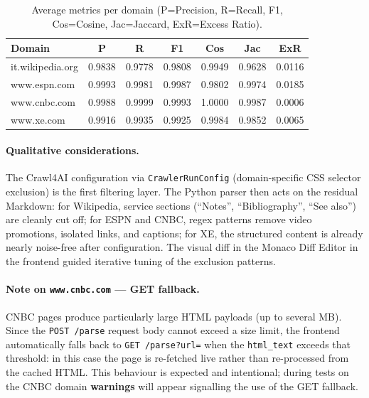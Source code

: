 \documentclass[11pt]{article}
\begin{document}
\begin{table}[h]
\centering
\small
\begin{tabular}{lcccccc}
\toprule
\textbf{Domain} & \textbf{P} & \textbf{R} & \textbf{F1} & \textbf{Cos} & \textbf{Jac} & \textbf{ExR}\\
\midrule
it.wikipedia.org  & 0.9838 & 0.9778 & 0.9808 & 0.9949 & 0.9628 & 0.0116 \\
www.espn.com      & 0.9993 & 0.9981 & 0.9987 & 0.9802 & 0.9974 & 0.0185 \\
www.cnbc.com      & 0.9988 & 0.9999 & 0.9993 & 1.0000 & 0.9987 & 0.0006 \\
www.xe.com        & 0.9916 & 0.9935 & 0.9925 & 0.9984 & 0.9852 & 0.0065 \\
\bottomrule
\end{tabular}
\caption{Average metrics per domain (P=Precision, R=Recall, F1, Cos=Cosine, Jac=Jaccard, ExR=Excess Ratio).}
\end{table}

\paragraph{Qualitative considerations.} The Crawl4AI configuration via \texttt{CrawlerRunConfig} (domain-specific CSS selector exclusion) is the first filtering layer. The Python parser then acts on the residual Markdown: for Wikipedia, service sections (``Notes'', ``Bibliography'', ``See also'') are cleanly cut off; for ESPN and CNBC, regex patterns remove video promotions, isolated links, and captions; for XE, the structured content is already nearly noise-free after configuration. The visual diff in the Monaco Diff Editor in the frontend guided iterative tuning of the exclusion patterns.

\paragraph{Note on \texttt{www.cnbc.com} — GET fallback.} CNBC pages produce particularly large HTML payloads (up to several MB). Since the \texttt{POST /parse} request body cannot exceed a size limit, the frontend automatically falls back to \texttt{GET /parse?url=} when the \texttt{html\_text} exceeds that threshold: in this case the page is re-fetched live rather than re-processed from the cached HTML. This behaviour is expected and intentional; during tests on the CNBC domain \textbf{warnings} will appear signalling the use of the GET fallback.

\end{document}
